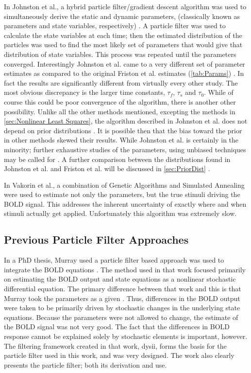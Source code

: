 In Johnston et al., a hybrid particle filter/gradient
descent algorithm was used to simultaneously derive the static and dynamic 
parameters, (classically known as parameters and state variables, respectively)
 \cite{Johnston2008}.
A particle filter was used to calculate the state variables at each
time; then the estimated distribution of the particles was used to find
the most likely set of parameters that would give that distribution of state variables.
This process was repeated until the parameters converged. Interestingly Johnston et al.
came to a very different set of parameter estimates as compared
to the original Friston et al. estimates (\autoref{tab:Params})
\cite{Johnston2008, Friston2000}. In fact the results 
are significantly different from virtually every other study. The most obvious discrepancy
is the larger time constants, $\tau_f$, $\tau_s$ and $\tau_0$. 
While of course this could be poor convergence of the algorithm, there is another other possibility.
Unlike all the other methods mentioned, excepting the methods in \autoref{sec:Nonlinear Least Squares},
the algorithm described in Johnston et al. does not depend on prior distributions \cite{Johnston2008}.
It is possible then that the bias toward the prior in other methods skewed their results. 
While Johnston et al. is certainly in the minority; further exhaustive studies 
of the parameters, using unbiased techniques may be called for \cite{Johnston2008}. A further 
comparison between the distributions found in Johnston et al. and Friston et al. 
will be discussed in \autoref{sec:PriorDist} \cite{Johnston2008, Friston2000}.

In Vakorin et al., a combination of Genetic Algorithms and Simulated Annealing were
used to estimate not only the parameters, but the true stimuli driving the BOLD
signal. This addresses the inherent uncertainty of exactly where and when 
stimuli actually get applied. Unfortunately this algorithm was extremely slow.

\subsection{Previous Particle Filter Approaches}
In a PhD thesis, Murray used a particle filter based approach was used to integrate
the BOLD equations \cite{Murray2008}. The method used in that work focused primarily on estimating
the BOLD output and state equations as a nonlinear stochastic differential 
equation. The primary difference between that work and this is that
Murray took the parameters as a given \cite{Murray2008}. Thus, differences in the BOLD output
were taken to be primarily driven by stochastic changes in the underlying state
equations. Because the parameters were not allowed to change, the estimate of 
the BOLD signal was not very good. The fact that the
differences in BOLD response cannot be explained solely by stochastic elements 
is important, however. The filtering framework created
in that work, dysii, forms the basis for the particle filter used in this work, 
and was very designed. The work also clearly presents the particle filter;
both its derivation and use. 

